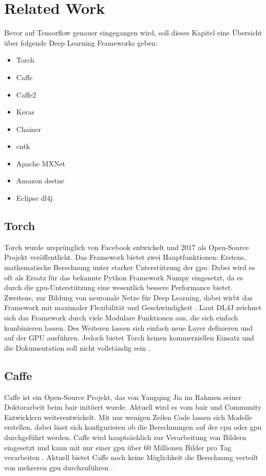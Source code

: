 \section{Related Work}
Bevor auf Tensorflow genauer eingegangen wird, soll dieses Kapitel eine Übersicht über folgende Deep Learning Frameworks geben:
\begin{multicols}{2}
	\begin{itemize}
		\item Torch
		\item Caffe
		\item Caffe2
		\item Keras
		\item Chainer
		\item \acs{cntk}
		\item Apache MXNet
		\item Amazon \acs{dsstne}
		\item Eclipse \acl{dl4j}
	\end{itemize}
\end{multicols}
	
\subsection{Torch}
Torch wurde ursprünglich von Facebook entwickelt und 2017 als Open-Source Projekt veröffentlicht. Das Framework bietet zwei Hauptfunktionen: Erstens, mathematische Berechnung unter starker Unterstützung der \ac{gpu}. Dabei wird es oft als Ersatz für das bekannte Python Framework Numpy eingesetzt, da es durch die \ac{gpu}-Unterstützung eine wesentlich bessere Performance bietet. Zweitens, zur Bildung von neuronale Netze für Deep Learning, dabei wirbt das Framework mit maximaler Flexibilität und Geschwindigkeit \cite{Torch}. Laut DL4J zeichnet sich das Framework durch viele Modulare Funktionen aus, die sich einfach kombinieren lassen. Des Weiteren lassen sich einfach neue Layer definieren und auf der GPU ausführen. Jedoch bietet Torch keinen kommerziellen Einsatz und die Dokumentation soll nicht vollständig sein \cite{DeepLearningFrameworks}. 

\subsection{Caffe}
Caffe ist ein Open-Source Projekt, das von Yangqing Jia im Rahmen seiner Doktorarbeit beim \ac{bair} initiiert wurde. Aktuell wird es vom \ac{bair} und Community Entwicklern weiterentwickelt. Mit nur wenigen Zeilen Code lassen sich Modelle erstellen, dabei lässt sich konfigurieren ob die Berechnungen auf der \acs{cpu} oder \ac{gpu} durchgeführt werden. Caffe wird hauptsächlich zur Verarbeitung von Bildern eingesetzt und kann mit nur einer \ac{gpu} über 60 Millionen Bilder pro Tag verarbeiten \cite{Caffe}. Aktuell bietet Caffe noch keine Möglichkeit die Berechnung verteilt von mehreren \ac{gpu} durchzuführen \cite{DeepLearningFrameworks}.


